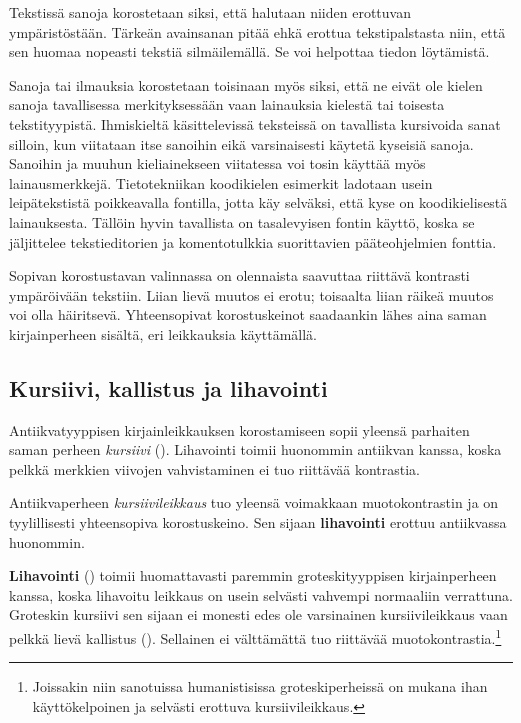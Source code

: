 Tekstissä sanoja korostetaan siksi, että halutaan niiden erottuvan
ympäristöstään. Tärkeän avainsanan pitää ehkä erottua tekstipalstasta
niin, että sen huomaa nopeasti tekstiä silmäilemällä. Se voi helpottaa
tiedon löytämistä.

Sanoja tai ilmauksia korostetaan toisinaan myös siksi, että ne eivät ole
kielen sanoja tavallisessa merkityksessään vaan lainauksia kielestä tai
toisesta tekstityypistä. Ihmiskieltä käsittelevissä teksteissä on
tavallista kursivoida sanat silloin, kun viitataan itse sanoihin eikä
varsinaisesti käytetä kyseisiä sanoja. Sanoihin ja muuhun kieliainekseen
viitatessa voi tosin käyttää myös lainausmerkkejä. Tietotekniikan
koodikielen esimerkit ladotaan usein leipätekstistä poikkeavalla
fontilla, jotta käy selväksi, että kyse on koodikielisestä lainauksesta.
Tällöin hyvin tavallista on tasalevyisen fontin käyttö, koska se
jäljittelee tekstieditorien ja komentotulkkia suorittavien
pääteohjelmien fonttia.

Sopivan korostustavan valinnassa on olennaista saavuttaa riittävä
kontrasti ympäröivään tekstiin. Liian lievä muutos ei erotu; toisaalta
liian räikeä muutos voi olla häiritsevä. Yhteensopivat korostuskeinot
saadaankin lähes aina saman kirjainperheen sisältä, eri leikkauksia
käyttämällä.

\subsection{Kursiivi, kallistus ja lihavointi}
\label{luku:peruskorostukset}

Antiikvatyyppisen kirjainleikkauksen korostamiseen sopii yleensä
parhaiten saman perheen \textit{kursiivi} ().
Lihavointi toimii huonommin antiikvan kanssa, koska pelkkä merkkien
viivojen vahvistaminen ei tuo riittävää kontrastia.

\begin{tulossis}
  \rmfamily Antiikvaperheen \textit{kursiivileikkaus} tuo yleensä
  voimakkaan muotokontrastin ja on tyylillisesti yhteensopiva
  korostuskeino. Sen sijaan \textbf{lihavointi} erottuu antiikvassa
  huonommin.
\end{tulossis}

\textbf{Lihavointi} () toimii huomattavasti paremmin
groteskityyppisen kirjainperheen kanssa, koska lihavoitu leikkaus on
usein selvästi vahvempi normaaliin verrattuna. Groteskin kursiivi sen
sijaan ei monesti edes ole varsinainen kursiivileikkaus vaan pelkkä
lievä kallistus (). Sellainen ei välttämättä tuo
riittävää muotokontrastia.\footnote{Joissakin niin sanotuissa
  humanistisissa groteskiperheissä on mukana ihan käyttökelpoinen ja
  selvästi erottuva kursiivileikkaus.}

